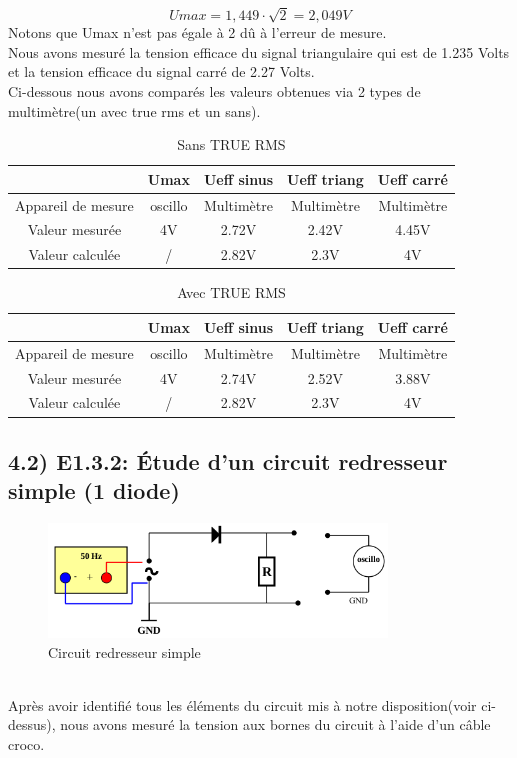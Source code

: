 \documentclass{report}
\begin{document}
\begin{equation}
   Umax = 1,449 \cdot \sqrt{2} = 2,049 V
\end{equation}
Notons que Umax n'est pas \'egale \`a 2 d\^u \`a l'erreur de mesure.
\\

Nous avons mesur\'e la tension efficace du signal triangulaire qui est de 1.235 Volts et la tension efficace du signal carr\'e de 2.27 Volts. \\
Ci-dessous nous avons comparés les valeurs obtenues via 2 types de multimètre(un avec true rms et un sans).
\begin{table}[h]
\begin{tabular}{|c|c|c|c|c|}
  \hline
   & Umax & Ueff sinus & Ueff triang & Ueff carré \\
  \hline
  Appareil de mesure & oscillo & Multimètre & Multimètre & Multimètre \\
  \hline
  Valeur mesurée & 4V & 2.72V & 2.42V & 4.45V \\
  \hline
  Valeur calculée & / & 2.82V & 2.3V & 4V \\
  \hline
\end{tabular}
\caption{Sans TRUE RMS}
\end{table}

\begin{table}[h]
\begin{tabular}{|c|c|c|c|c|}
  \hline
   & Umax & Ueff sinus & Ueff triang  & Ueff carré \\
  \hline
  Appareil de mesure & oscillo & Multimètre & Multimètre & Multimètre \\
  \hline
  Valeur mesurée & 4V & 2.74V & 2.52V & 3.88V \\
  \hline
  Valeur calculée & / & 2.82V & 2.3V & 4V \\
  \hline
\end{tabular}
\caption{Avec TRUE RMS}
\end{table}

\subsection*{4.2) E1.3.2: \'Etude d'un circuit redresseur simple (1 diode)}
\hspace*{0.5cm}
\begin{figure}[ht!]
\centering
\includegraphics[width=90mm]{circuitE1.3.2.png}
\caption{Circuit redresseur simple}
\label{overflow}
\end{figure}
\\
Apr\`es avoir identifi\'e tous les \'el\'ements du circuit mis \`a notre disposition(voir ci-dessus), nous avons mesur\'e la tension aux bornes du circuit \`a l'aide d'un c\^able croco.
\end{document}
